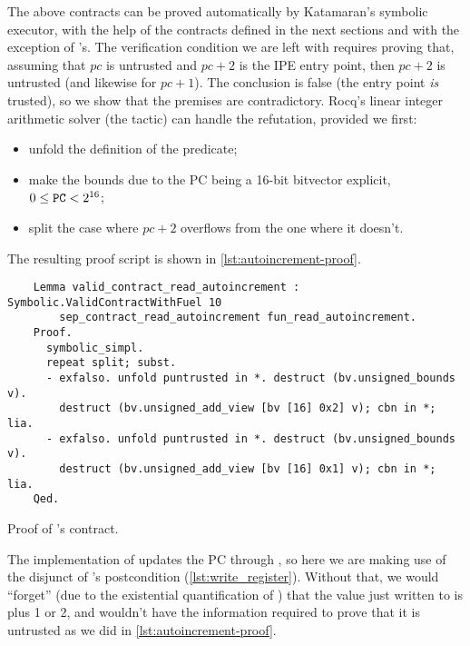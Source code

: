 The above contracts can be proved automatically by Katamaran's symbolic executor, with the help of the contracts defined in the next sections and with the exception of 's. The verification condition we are left with requires proving that, assuming that \(\mathit{pc}\) is untrusted and \(\mathit{pc} + 2\) is the IPE entry point, then \(\mathit{pc} + 2\) is untrusted (and likewise for \(\mathit{pc} + 1\)). The conclusion is false (the entry point \emph{is} trusted), so we show that the premises are contradictory. Rocq's linear integer arithmetic solver (the  tactic) can handle the refutation, provided we first:
\begin{itemize}
\item unfold the definition of the  predicate;
\item make the bounds due to the PC being a 16-bit bitvector explicit, \ie \(0 \leq \reg{PC} < 2^{16}\);
\item split the case where \(\mathit{pc} + 2\) overflows from the one where it doesn't.
\end{itemize}
The resulting proof script is shown in \cref{lst:autoincrement-proof}.

\begin{listing}
  \begin{verbatim}
    Lemma valid_contract_read_autoincrement : Symbolic.ValidContractWithFuel 10
        sep_contract_read_autoincrement fun_read_autoincrement.
    Proof.
      symbolic_simpl.
      repeat split; subst.
      - exfalso. unfold puntrusted in *. destruct (bv.unsigned_bounds v).
        destruct (bv.unsigned_add_view [bv [16] 0x2] v); cbn in *; lia.
      - exfalso. unfold puntrusted in *. destruct (bv.unsigned_bounds v).
        destruct (bv.unsigned_add_view [bv [16] 0x1] v); cbn in *; lia.
    Qed.
  \end{verbatim}
  \caption{Proof of 's contract.}
  \label{lst:autoincrement-proof}
\end{listing}

The implementation of  updates the PC through , so here we are making use of the disjunct  of 's postcondition (\cref{lst:write_register}). Without that, we would ``forget'' (due to the existential quantification of ) that the value just written to  is  plus 1 or 2, and wouldn't have the information required to prove that it is untrusted as we did in \cref{lst:autoincrement-proof}.

